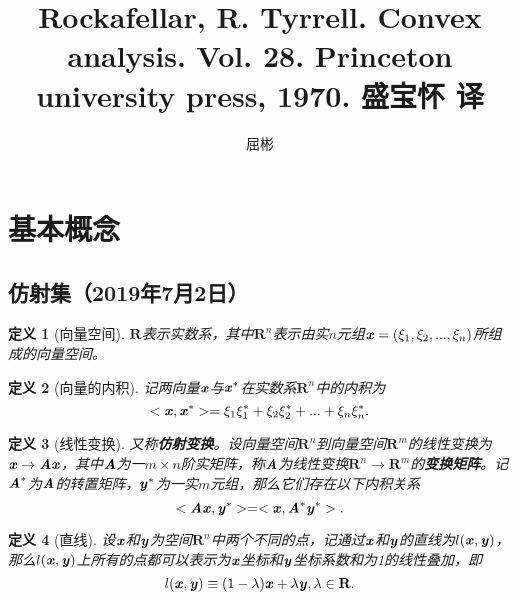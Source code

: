 \documentclass[a4paper,11pt,oneside]{article}
\newtheorem{definition}{定义}[section]
\begin{document}
	\title{Rockafellar, R. Tyrrell. Convex analysis. Vol. 28. Princeton university press, 1970. 盛宝怀 译}
	\author{屈彬}
	\maketitle
	
	\section{基本概念}
		\subsection{仿射集（2019年7月2日）}
			\begin{definition}[向量空间]
				$\textbf{R}$表示实数系，其中$\textbf{R}^{n}$表示由实$n$元组$\textbf{\textit{x}}=(\xi_{1},\xi_{2},...,\xi_{n})$所组成的向量空间。
			\end{definition}
			\begin{definition}[向量的内积]
				记两向量$\textbf{\textit{x}}$与$\textbf{\textit{x}}^{*}$在实数系$\textbf{R}^{n}$中的内积为
				$$<\textbf{\textit{x}},\textbf{\textit{x}}^{*}>=\xi_{1}\xi_{1}^{*}+\xi_{2}\xi_{2}^{*}+...+\xi_{n}\xi_{n}^{*}.$$
			\end{definition}
			\begin{definition}[线性变换]
				又称\textbf{仿射变换}。设向量空间$\textbf{R}^{n}$到向量空间$\textbf{R}^{m}$的线性变换为$\textbf{\textit{x}} \rightarrow \textbf{\textit{A}} \textbf{\textit{x}}$，其中$\textbf{\textit{A}}$为一$m\times n$阶实矩阵，称$\textbf{\textit{A}}$为线性变换$\textbf{R}^{n} \rightarrow \textbf{R}^{m}$的\textbf{变换矩阵}。记$\textbf{\textit{A}}^{*}$为$\textbf{\textit{A}}$的转置矩阵，$\textbf{\textit{y}}^{*}$为一实$m$元组，那么它们存在以下内积关系
				$$<\textbf{\textit{A}}\textbf{\textit{x}}, \textbf{\textit{y}}^{*}> = <\textbf{\textit{x}}, \textbf{\textit{A}}^{*} \textbf{\textit{y}}^{*}>.$$
			\end{definition}
			\begin{definition}[直线]
				设$\textbf{\textit{x}}$和$\textbf{\textit{y}}$为空间$\textbf{R}^{n}$中两个不同的点，记通过$\textbf{\textit{x}}$和$\textbf{\textit{y}}$的直线为$l(\textbf{\textit{x}},\textbf{\textit{y}})$，那么$l(\textbf{\textit{x}},\textbf{\textit{y}})$上所有的点都可以表示为$\textbf{\textit{x}}$坐标和$\textbf{\textit{y}}$坐标系数和为1的线性叠加，即
				$$l(\textbf{\textit{x}},\textbf{\textit{y}})\equiv(1-\lambda)\textbf{\textit{x}}+\lambda\textbf{\textit{y}}, \lambda \in \textbf{R}.$$
			\end{definition}
\end{document}
